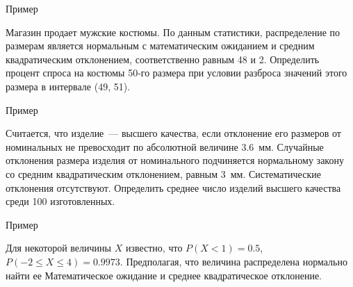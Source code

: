 \documentclass[unicode,11pt,notheorems,xcolor=table]{beamer}
\begin{document}
\begin{frame}[t]{Пример}
    \begin{block}{}
        Магазин продает мужские костюмы. По данным статистики, распределение по размерам является нормальным с математическим ожиданием и средним квадратическим отклонением, соответственно равным 48 и 2. Определить процент спроса на костюмы 50-го размера при условии разброса значений этого размера в интервале (49, 51).
    \end{block}
\end{frame}
\begin{frame}[t]{Пример}
    \begin{block}{}
        Считается, что изделие~--- высшего качества, если отклонение его размеров от номинальных не превосходит по абсолютной величине 3.6~мм. Случайные отклонения размера изделия от номинального подчиняется нормальному закону со средним квадратическим отклонением, равным 3~мм. Систематические отклонения отсутствуют. Определить среднее число изделий высшего качества среди 100 изготовленных.
    \end{block}
\end{frame}
\begin{frame}[t]{Пример}
    \begin{block}{}
        Для некоторой величины $X$ известно, что $P(X<1)=0.5$, $P(-2\leqslant X\leqslant 4)=0.9973$. Предполагая, что величина распределена нормально найти ее Математическое ожидание и среднее квадратическое отклонение.
    \end{block}
\end{frame}

\end{document}
